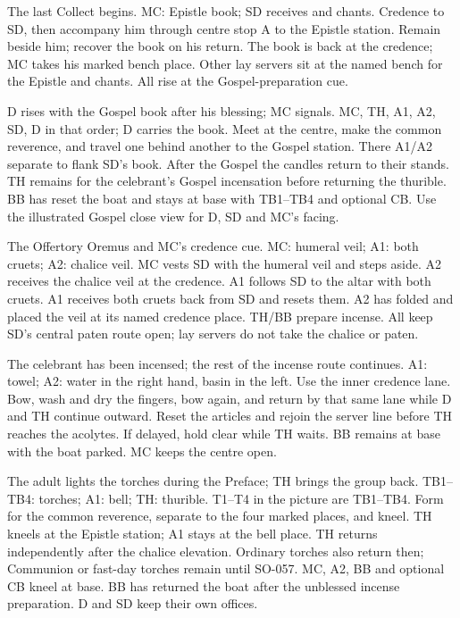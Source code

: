{\SolemnBookPositions}
{The last Collect begins.}
{MC: Epistle book; SD receives and chants.}
{Credence to SD, then accompany him through centre stop A to the
Epistle station. Remain beside him; recover the book on his return.}
{The book is back at the credence; MC takes his marked bench place.}
{Other lay servers sit at the named bench for the Epistle and chants.
All rise at the Gospel-preparation cue.}

{\SolemnGospelRoutePositions}
{D rises with the Gospel book after his blessing; MC signals.}
{MC, TH, A1, A2, SD, D in that order; D carries the book.}
{Meet at the centre, make the common reverence, and travel one behind
another to the Gospel station. There A1/A2 separate to flank SD's book.}
{After the Gospel the candles return to their stands. TH remains for
the celebrant's Gospel incensation before returning the thurible.}
{BB has reset the boat and stays at base with TB1--TB4 and optional CB.
Use the illustrated Gospel close view for D, SD and MC's facing.}

{\SolemnOffertoryPositions}
{The Offertory Oremus and MC's credence cue.}
{MC: humeral veil; A1: both cruets; A2: chalice veil.}
{MC vests SD with the humeral veil and steps aside. A2 receives the
chalice veil at the credence. A1 follows SD to the altar with both cruets.}
{A1 receives both cruets back from SD and resets them. A2 has folded
and placed the veil at its named credence place.}
{TH/BB prepare incense. All keep SD's central paten route open; lay
servers do not take the chalice or paten.}

{\SungLavaboPositions}
{The celebrant has been incensed; the rest of the incense route continues.}
{A1: towel; A2: water in the right hand, basin in the left.}
{Use the inner credence lane. Bow, wash and dry the fingers, bow again,
and return by that same lane while D and TH continue outward.}
{Reset the articles and rejoin the server line before TH reaches the
acolytes. If delayed, hold clear while TH waits.}
{BB remains at base with the boat parked. MC keeps the centre open.}

{\SungCanonPositions}
{The adult lights the torches during the Preface; TH brings the group back.}
{TB1--TB4: torches; A1: bell; TH: thurible. T1--T4 in the picture are TB1--TB4.}
{Form for the common reverence, separate to the four marked places,
and kneel. TH kneels at the Epistle station; A1 stays at the bell place.}
{TH returns independently after the chalice elevation. Ordinary torches
also return then; Communion or fast-day torches remain until SO-057.}
{MC, A2, BB and optional CB kneel at base. BB has returned the boat
after the unblessed incense preparation. D and SD keep their own offices.}

